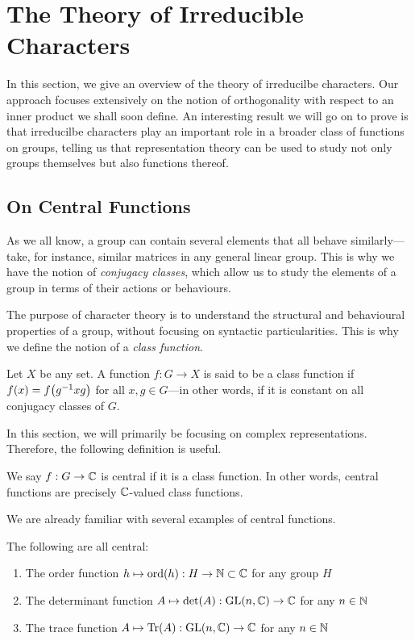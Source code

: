 \section{The Theory of Irreducible Characters}

In this section, we give an overview of the theory of irreducilbe characters. Our approach focuses extensively on the notion of orthogonality with respect to an inner product we shall soon define. An interesting result we will go on to prove is that irreducilbe characters play an important role in a broader class of functions on groups, telling us that representation theory can be used to study not only groups themselves but also functions thereof.

\subsection{On Central Functions}

As we all know, a group can contain several elements that all behave similarly---take, for instance, similar matrices in any general linear group. This is why we have the notion of \textit{conjugacy classes}, which allow us to study the elements of a group in terms of their actions or behaviours.

The purpose of character theory is to understand the structural and behavioural properties of a group, without focusing on syntactic particularities. This is why we define the notion of a \textit{class function}.

\begin{definition}
    Let $X$ be any set. A function $f : G \to X$ is said to be a class function if $f\!\left( x \right) = f\!\left( g^{-1} x g \right)$ for all $x,g \in G$---in other words, if it is constant on all conjugacy classes of $G$.
\end{definition}

In this section, we will primarily be focusing on complex representations. Therefore, the following definition is useful.

\begin{boxdefinition}
    We say $f : G \to \mathbb{C}$ is central if it is a class function. In other words, central functions are precisely $\mathbb{C}$-valued class functions.
\end{boxdefinition}

We are already familiar with several examples of central functions.

\begin{boxexample} \label{Ch2:Eg:Central_Funcs}
    The following are all central:
    \begin{enumerate}
        \item The order function $h \mapsto \operatorname{ord}\!\left( h \right) : H \to \mathbb{N} \subset \mathbb{C}$ for any group $H$
        \item The determinant function $A \mapsto \det\!\left( A \right) : \operatorname{GL}\!\left( n, \mathbb{C} \right) \to \mathbb{C}$ for any $n \in \mathbb{N}$
        \item The trace function $A \mapsto \operatorname{Tr}\!\left( A \right) : \operatorname{GL}\!\left( n, \mathbb{C} \right) \to \mathbb{C}$ for any $n \in \mathbb{N}$
    \end{enumerate}
\end{boxexample}

